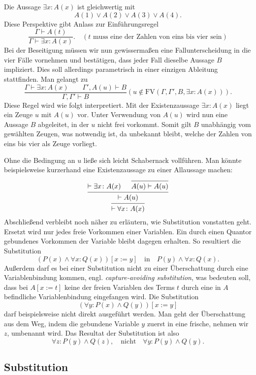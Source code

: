Die Aussage $\exists x\colon A(x)$ ist gleichwertig mit
\[A(1)\lor A(2)\lor A(3)\lor A(4).\]
Diese Perspektive gibt Anlass zur Einführungsregel
\[\dfrac{\Gamma\vdash A(t)}{\Gamma\vdash\exists x\colon A(x)}.\quad
(\text{$t$ muss eine der Zahlen von eins bis vier sein})\]
Bei der Beseitigung müssen wir nun gewissermaßen eine Fallunterscheidung
in die vier Fälle vornehmen und bestätigen, dass jeder Fall dieselbe
Aussage $B$ impliziert. Dies soll allerdings parametrisch in einer
einzigen Ableitung stattfinden. Man gelangt zu
\[\dfrac{\Gamma\vdash\exists x\colon A(x)\qquad\Gamma',A(u)\vdash B}
{\Gamma,\Gamma'\vdash B}(u\notin\mathrm{FV}(\Gamma,\Gamma',B,\exists x\colon A(x))).\]
Diese Regel wird wie folgt interpretiert. Mit der Existenzaussage
$\exists x\colon A(x)$ liegt ein Zeuge $u$ mit $A(u)$ vor. Unter
Verwendung von $A(u)$ wird nun eine Aussage $B$ abgeleitet, in der $u$
nicht frei vorkommt. Somit gilt $B$ unabhängig vom gewählten Zeugen,
was notwendig ist, da unbekannt bleibt, welche der Zahlen von eins
bis vier als Zeuge vorliegt.

Ohne die Bedingung an $u$ ließe sich leicht Schabernack vollführen.
Man könnte beispielsweise kurzerhand eine Existenzaussage zu einer
Allaussage machen:
\[\begin{prooftree}
    \hypo{\vdash\exists x\colon A(x)}
    \infer0{A(u)\vdash A(u)}
  \infer2{\vdash A(u)}
\infer1{\vdash\forall x\colon A(x)}
\end{prooftree}\]
Abschließend verbleibt noch näher zu erläutern, wie Substitution
vonstatten geht. Ersetzt wird nur jedes freie Vorkommen einer
Variablen. Ein durch einen Quantor gebundenes Vorkommen der Variable
bleibt dagegen erhalten. So resultiert die Substitution
\[(P(x)\land\forall x: Q(x))[x:=y]\quad\text{in}\quad
P(y)\land\forall x\colon Q(x).\]
Außerdem darf es bei einer Substitution nicht zu einer Überschattung
durch eine Variablenbindung kommen, engl. \emph{capture-avoiding substitution},
was bedeuten soll, dass bei $A[x:=t]$ keine der freien Variablen des Terms $t$
durch eine in $A$ befindliche Variablenbindung eingefangen wird. Die
Substitution
\[(\forall y\colon P(x)\land Q(y))[x:=y]\]
darf beispielsweise nicht direkt ausgeführt werden. Man geht der
Überschattung aus dem Weg, indem die gebundene Variable $y$ zuerst
in eine frische, nehmen wir $z$, umbenannt wird. Das Resultat der
Substitution ist also
\[\forall z\colon P(y)\land Q(z),\quad\text{nicht}\quad
\forall y\colon P(y)\land Q(y).\]

\subsection{Substitution}


